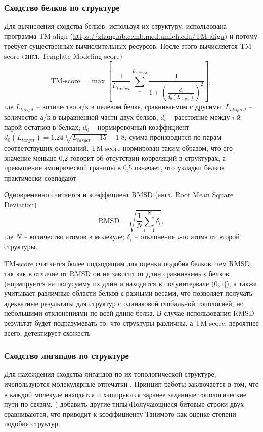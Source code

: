 \documentclass[a4paper,14pt]{article}         %
\begin{document}
\subsubsection{Сходство белков по структуре}
Для вычисления сходства белков, используя их структуру, использована программа TM-align (\href{https://zhanglab.ccmb.med.umich.edu/TM-align}{https://zhanglab.ccmb.med.umich.edu/TM-align}) %
и потому требует существенных вычислительных ресурсов. После этого вычисляется TM-score (англ. Template Modeling score)\cite{Levitt1998} 
\begin{equation}
\label{tm-score}
\text{TM-score} = \max\left[\frac{1}{L_{target}}\sum_i^{L_{aligned}}\frac{1}{1+\left(\frac{d_i}{d_0(L_{target})}\right)^2}\right],
\end{equation}
где $L_{target}$ -- количество а/к в целевом белке, сравниваемом с другими; $L_{aligned}$ -- количество а/к в выравненной части двух белков, $d_i$ -- расстояние между $i$-й парой остатков в белках; $d_0$ -- нормировочный коэффициент $d_0(L_{target}) = 1.24\sqrt[3]{L_{target}-15}-1.8$; сумма производится по парам соответствущих оснований. TM-score нормирован таким образом, что его значение меньше 0,2 говорит об отсутствии корреляций в структурах, а превышение эмпирической границы в 0,5 означает, что укладки белков практически совпадают %

Одновременно считается и коэффициент RMSD (англ. Root Mean Square Deviation) %
\begin{equation}
\label{rmsd}
\text{RMSD} = \sqrt{\frac{1}{N}\sum_{i=1}^N \delta_i},
\end{equation}
где $N$ -- количество атомов в молекуле; $\delta_i$ -- отклонение $i$-го атома от второй структуры.

TM-score считается более подходящим для оценки подобия белков, чем RMSD, так как в отличие от RMSD он не зависит от длин сравниваемых белков (нормируется на полусумму их длин и находится в полуинтервале $(0, 1]$), а также учитывает различные области белков с разными весами, что позволяет получать адекватные результаты для структур с одинаковой глобальной топологией, но небольшими отклонениями по всей длине белка. В случае использования RMSD результат будет подразумевать то, что структуры различны, а TM-score, вероятнее всего, детектирует схожесть %
\subsubsection{Сходство лигандов по структуре}
Для нахождения сходства лигандов по их топологической структуре, ичспользуются молекулярные отпечатки \cite{Cereto-Massague2015}. Принцип работы заключается в том, что в каждой молекуле находятся и хэшируются заранее заданные топологические пути по связям. (\color{orange} добавить другие типы\color{black})Получающиеся битовые строки двух сравниваются, что приводит к коэффициенту Танимото как оценке степени подобия структур.
\end{document}
